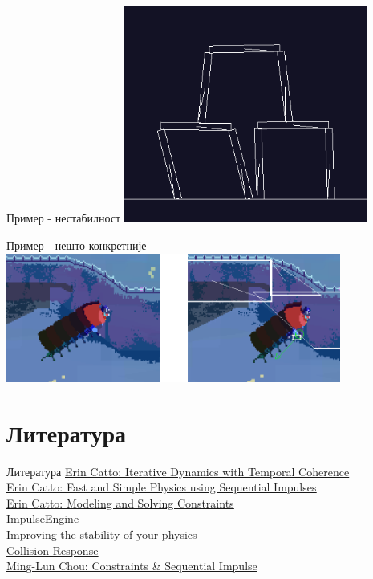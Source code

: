 \documentclass[]{beamer}
\begin{document}
\begin{frame}{Пример - нестабилност}
    \includegraphics[width=8cm]{ss_02.png}
\end{frame}

\begin{frame}{Пример - нешто конкретније}
    \includegraphics[width=11cm]{ss_03.png}
\end{frame}


\section{Литература}
\begin{frame}{Литература}
    \color{blue}
    \underline{\href{https://box2d.org/files/ErinCatto_IterativeDynamics_GDC2005.pdf}{Erin Catto: Iterative Dynamics with Temporal Coherence}} \\
    \underline{\href{https://box2d.org/files/ErinCatto_SequentialImpulses_GDC2006.pdf}{Erin Catto: Fast and Simple Physics using Sequential Impulses}} \\
    \underline{\href{https://box2d.org/files/ErinCatto_SequentialImpulses_GDC2006.pdf}{Erin Catto: Modeling and Solving Constraints}} \\
    \underline{\href{https://github.com/tutsplus/ImpulseEngine}{ImpulseEngine}} \\
    \underline{\href{https://kevinyu.net/2018/02/01/improving-the-stability-of-your-physics/}{Improving the stability of your physics}} \\
    \underline{\href{https://research.ncl.ac.uk/game/mastersdegree/gametechnologies/previousinformation/physics6collisionresponse/2017\%20Tutorial\%206\%20-\%20Collision\%20Response.pdf}{Collision Response}} \\
    \underline{\href{http://allenchou.net/2013/12/game-physics-constraints-sequential-impulse/}{Ming-Lun Chou: Constraints \& Sequential Impulse}}
    
\end{frame}
\end{document}
